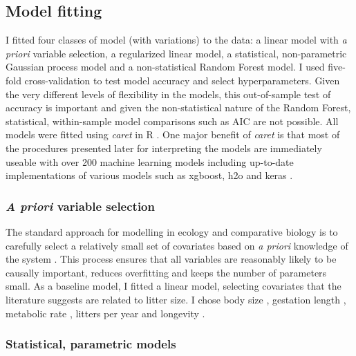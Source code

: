 \documentclass[12pt]{article}
\begin{document}
\subsection{Model fitting}\label{model-fitting}



I fitted four classes of model (with variations) to the data: a linear model with \emph{a priori} variable selection, a regularized linear model, a statistical, non-parametric Gaussian process model and a non-statistical Random Forest model.
I used five-fold cross-validation to test model accuracy and select hyperparameters.
Given the very different levels of flexibility in the models, this out-of-sample test of accuracy is important and given the non-statistical nature of the Random Forest, statistical, within-sample model comparisons such as AIC are not possible.
All models were fitted using \emph{caret} \citep{caret} in R \citep{R}.
One major benefit of \emph{caret} is that most of the procedures presented later for interpreting the models are immediately useable with over 200 machine learning models including up-to-date implementations of various models such as xgboost, h2o and keras \citep{xgboost, h2o, keras}.

\subsubsection{\texorpdfstring{\emph{A priori} variable selection}{A priori variable selection}}\label{a-priori-variable-selection}

The standard approach for modelling in ecology and comparative biology is to carefully select a relatively small set of covariates based on \emph{a priori} knowledge of the system \citep{whittingham2006we}.
This process ensures that all variables are reasonably likely to be causally important, reduces overfitting and keeps the number of parameters small.
As a baseline model, I fitted a linear model, selecting covariates that the literature suggests are related to litter size.
I chose body size \citep{leutenegger1979evolution, tuomi1980mammalian}, gestation length \citep{okkens1993influence, bielby2007fast}, metabolic rate \citep{white2004does}, litters per year \citep{white2004does} and longevity \citep{wilkinson2002life, zammuto1986life}.



\subsubsection{Statistical, parametric models}\label{statistical-parametric-models}
\end{document}
